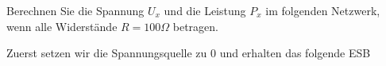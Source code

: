 																				 \beginbsp
																				Berechnen Sie die Spannung $U_x$ und die Leistung $P_x$ im folgenden Netzwerk, wenn alle Widerstände $ R = 100 \Omega$ betragen. \\
																					\begin{center}
																						\fix
																					\end{center}
																					\iend
																					\newpage
																					\beginbsp
																					Zuerst setzen wir die Spannungsquelle zu 0 und erhalten das folgende ESB \\
																					\begin{center}
																						\fix
																					\end{center}

